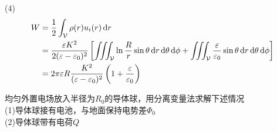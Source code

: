 \documentclass{mynote}
\begin{document}
\begin{solution}
(4) 
\begin{align*}
    W &= \frac{1}{2} \int_{\mathcal{V}} \rho(r) u_i(r) \mathop{}\!\mathrm{d} r \\
    &= \frac{\varepsilon K^2}{2(\varepsilon - \varepsilon_0)^2} \left[ \iiint_{\mathcal{V}} \ln \frac{R}{r} \sin \theta \mathop{}\!\mathrm{d} r \mathop{}\!\mathrm{d} \theta \mathop{}\!\mathrm{d} \phi + \iiint_{\mathcal{V}} \frac{\varepsilon}{\varepsilon_0} \sin \theta \mathop{}\!\mathrm{d} r \mathop{}\!\mathrm{d} \theta \mathop{}\!\mathrm{d} \phi  \right] \\
    &= 2\pi \varepsilon R \frac{K^2}{(\varepsilon - \varepsilon_0)^2} \left( 1 + \frac{\varepsilon}{\varepsilon_0}\right)
\end{align*}
\end{solution}






\begin{exercise}{2.2}
    均匀外置电场放入半径为$R_0$的导体球，用分离变量法求解下述情况\\
    (1)导体球接有电池，与地面保持电势差$\varPhi_0$ \\
    (2)导体球带有电荷$Q$
\end{exercise}
\end{document}
